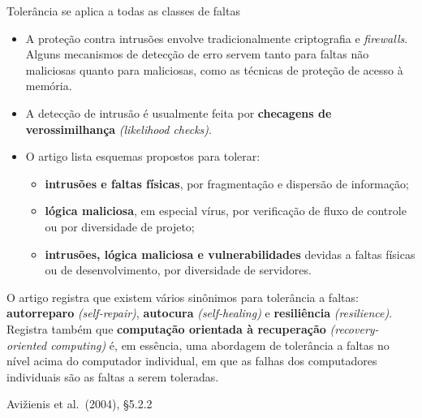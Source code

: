 \documentclass{beamer}
\newcommand{\en}[1]{{\color{depCinza}\textit{#1}}}
\newcommand{\sect}[1]{\par\smallskip\hfill{\tiny\color{black!55}Avi\v{z}ienis et al.\ (2004), #1}}
\begin{document}
\begin{frame}{Toler\^ancia se aplica a todas as classes de faltas}
    \footnotesize
    \begin{itemize}
        \item A prote\c{c}\~ao contra intrus\~oes envolve tradicionalmente criptografia e \textit{firewalls}. Alguns mecanismos de detec\c{c}\~ao de erro servem tanto para faltas n\~ao maliciosas quanto para maliciosas, como as t\'ecnicas de prote\c{c}\~ao de acesso \`a mem\'oria.
        \item A detec\c{c}\~ao de intrus\~ao \'e usualmente feita por \textbf{checagens de verossimilhan\c{c}a} \en{(likelihood checks)}.
        \item O artigo lista esquemas propostos para tolerar:
        \begin{itemize}
            \item \textbf{intrus\~oes e faltas f\'isicas}, por fragmenta\c{c}\~ao e dispers\~ao de informa\c{c}\~ao;
            \item \textbf{l\'ogica maliciosa}, em especial v\'irus, por verifica\c{c}\~ao de fluxo de controle ou por diversidade de projeto;
            \item \textbf{intrus\~oes, l\'ogica maliciosa e vulnerabilidades} devidas a faltas f\'isicas ou de desenvolvimento, por diversidade de servidores.
        \end{itemize}
    \end{itemize}
    \medskip
    \begin{defi}
        \scriptsize
        O artigo registra que existem v\'arios sin\^onimos para toler\^ancia a faltas: \textbf{autorreparo} \en{(self-repair)}, \textbf{autocura} \en{(self-healing)} e \textbf{resili\^encia} \en{(resilience)}.\\[3pt]
        Registra tamb\'em que \textbf{computa\c{c}\~ao orientada \`a recupera\c{c}\~ao} \en{(recovery-oriented computing)} \'e, em ess\^encia, uma abordagem de toler\^ancia a faltas no n\'ivel acima do computador individual, em que as falhas dos computadores individuais s\~ao as faltas a serem toleradas.
    \end{defi}
    \sect{\S5.2.2}
\end{frame}
\end{document}
